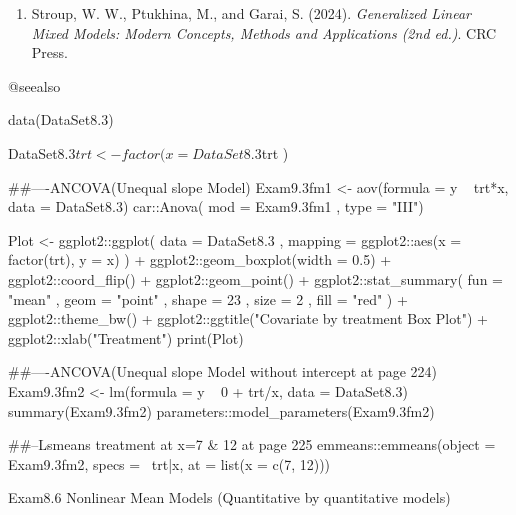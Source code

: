 \documentclass[a4paper]{book}
\begin{document}
%
\begin{References}
\begin{enumerate}

\item{} Stroup, W. W., Ptukhina, M., and Garai, S. (2024).
\emph{Generalized Linear Mixed Models: Modern Concepts, Methods and Applications (2nd ed.)}.
CRC Press.

\end{enumerate}



@seealso
\end{References}
%
\begin{Examples}
\begin{ExampleCode}

data(DataSet8.3)

DataSet8.3$trt <- factor(x = DataSet8.3$trt )

##----ANCOVA(Unequal slope Model)
Exam9.3fm1 <- aov(formula = y ~ trt*x, data = DataSet8.3)
car::Anova( mod = Exam9.3fm1 , type = "III")

Plot <-
   ggplot2::ggplot(
          data    = DataSet8.3
        , mapping = ggplot2::aes(x = factor(trt), y = x)
         )                              +
   ggplot2::geom_boxplot(width = 0.5)  +
   ggplot2::coord_flip()               +
   ggplot2::geom_point()               +
   ggplot2::stat_summary(
         fun    = "mean"
       , geom   = "point"
       , shape  =  23
       , size   =  2
       , fill   = "red"
       )                               +
   ggplot2::theme_bw()                 +
   ggplot2::ggtitle("Covariate by treatment Box Plot") +
   ggplot2::xlab("Treatment")
print(Plot)

##----ANCOVA(Unequal slope Model without intercept at page 224)
Exam9.3fm2 <- lm(formula = y ~ 0 + trt/x, data = DataSet8.3)
summary(Exam9.3fm2)
parameters::model_parameters(Exam9.3fm2)

##--Lsmeans treatment at x=7 & 12 at page 225
emmeans::emmeans(object = Exam9.3fm2, specs = ~trt|x, at = list(x = c(7, 12)))

\end{ExampleCode}
\end{Examples}
%
\begin{Description}
Exam8.6 Nonlinear Mean Models (Quantitative by quantitative models)
\end{Description}
\end{document}

